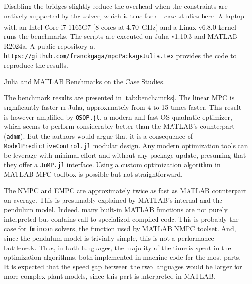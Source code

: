 Disabling the bridges slightly reduce the overhead when the constraints are natively supported by the solver, which is true for all case studies here. A laptop with an Intel\textsuperscript{\textregistered} Core\textsuperscript{\texttrademark} i7-1165G7 (8 cores at \SI{4.70}{\giga\hertz}) and a Linux v6.8.0 kernel runs the benchmarks. The scripts are executed on Julia v1.10.3 and MATLAB R2024a. A public repository at \texttt{https://github.com/franckgaga/mpcPackageJulia.tex} provides the code to reproduce the results. 

\begin{table}
    \centering
    \caption{Julia and MATLAB Benchmarks on the Case Studies.}
    \label{tab:benchamrks}
    \centering
	
\end{table}

The benchmark results are presented in \cref{tab:benchamrks}. The linear MPC is significantly faster in Julia, approximately from 4 to 15 times faster. This result is however amplified by \texttt{OSQP.jl}, a modern and fast OS quadratic optimizer, which seems to perform considerably better than the MATLAB's counterpart (\texttt{admm}). But the authors would argue that it is a consequence of \texttt{ModelPredictiveControl.jl} modular design. Any modern optimization tools can be leverage with minimal effort and without any package update, presuming that they offer a \texttt{JuMP.jl} interface. Using a custom optimization algorithm in MATLAB MPC toolbox is possible but not straightforward. 

The NMPC and EMPC are approximately twice as fast as MATLAB counterpart on average. This is presumably explained by MATLAB's internal and the pendulum model. Indeed, many built-in MATLAB functions are not purely interpreted but contains call to specialized compiled code. This is probably the case for \texttt{fmincon} solvers, the function used by MATLAB NMPC toolset. And, since the pendulum model is trivially simple, this is not a performance bottleneck. Thus, in both languages, the majority of the time is spent in the optimization algorithms, both implemented in machine code for the most parts. It is expected that the speed gap between the two languages would be larger for more complex plant models, since this part is interpreted in MATLAB.
